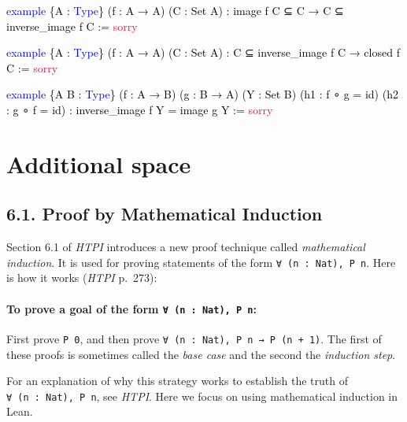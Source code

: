 \documentclass[
  letterpaper,
  DIV=11,
  numbers=noendperiod]{scrreprt}
\newenvironment{Shaded}{\begin{snugshade}}{\end{snugshade}}
\newcommand{\ConstantTok}[1]{\textcolor[rgb]{0.56,0.35,0.01}{#1}}
\newcommand{\KeywordTok}[1]{\textcolor[rgb]{0.00,0.23,0.31}{#1}}
\newcommand{\NormalTok}[1]{\textcolor[rgb]{0.00,0.23,0.31}{#1}}
\renewcommand{\NormalTok}[1]{\textcolor[HTML]{000000}{#1}}
\renewcommand{\KeywordTok}[1]{\textcolor[HTML]{0000FF}{#1}}
\renewcommand{\ConstantTok}[1]{\textcolor[HTML]{DC143C}{#1}}
\newenvironment{ind}
	{\begin{list}{}{\setlength{\leftmargin}{1em}}\item\relax}
	{\end{list}}
\theoremstyle{remark}
\begin{document}
\begin{Shaded}
\begin{Highlighting}[]
\KeywordTok{example}\NormalTok{ \{A : }\KeywordTok{Type}\NormalTok{\} (f : A → A) (C : Set A) :}
\NormalTok{    image f C ⊆ C → C ⊆ inverse\_image f C := }\ConstantTok{sorry}

\KeywordTok{example}\NormalTok{ \{A : }\KeywordTok{Type}\NormalTok{\} (f : A → A) (C : Set A) :}
\NormalTok{    C ⊆ inverse\_image f C → closed f C := }\ConstantTok{sorry}

\KeywordTok{example}\NormalTok{ \{A B : }\KeywordTok{Type}\NormalTok{\} (f : A → B) (g : B → A) (Y : Set B)}
\NormalTok{    (h1 : f ∘ g = id) (h2 : g ∘ f = id) :}
\NormalTok{    inverse\_image f Y = image g Y := }\ConstantTok{sorry}
\end{Highlighting}
\end{Shaded}


\hypertarget{additional-space}{%
\chapter{Additional space}\label{additional-space}}

\hypertarget{proof-by-mathematical-induction}{%
\section{6.1. Proof by Mathematical
Induction}\label{proof-by-mathematical-induction}}

Section 6.1 of \emph{HTPI} introduces a new proof technique called
\emph{mathematical induction}. It is used for proving statements of the
form \texttt{∀\ (n\ :\ Nat),\ P\ n}. Here is how it works (\emph{HTPI}
p.~273):

\hypertarget{to-prove-a-goal-of-the-form-n-nat-p-n}{%
\subsubsection{\texorpdfstring{To prove a goal of the form
\texttt{∀\ (n\ :\ Nat),\ P\ n}:}{To prove a goal of the form ∀ (n : Nat), P n:}}\label{to-prove-a-goal-of-the-form-n-nat-p-n}}

\begin{ind}
First prove \texttt{P\ 0}, and then prove
\texttt{∀\ (n\ :\ Nat),\ P\ n\ →\ P\ (n\ +\ 1)}. The first of these
proofs is sometimes called the \emph{base case} and the second the
\emph{induction step}.

\end{ind}

For an explanation of why this strategy works to establish the truth of
\texttt{∀\ (n\ :\ Nat),\ P\ n}, see \emph{HTPI}. Here we focus on using
mathematical induction in Lean.
\end{document}
